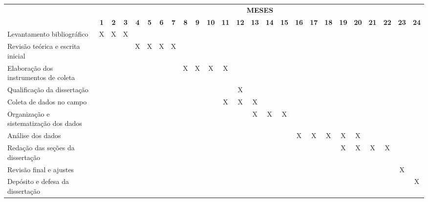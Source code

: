 \documentclass[
  brazilian,
  12pt,
  letterpaper,
  DIV=11,
  numbers=noendperiod]{scrartcl}
\begin{document}
\begin{table}[htbp]
\centering
\scriptsize %
\setlength{\tabcolsep}{2.5pt} %
\renewcommand{\arraystretch}{1.4} 

\begin{tabular}{|l|c|c|c|c|c|c|c|c|c|c|c|c|c|c|c|c|c|c|c|c|c|c|c|c|}
\hline
\rowcolor[gray]{0.9} 
\multicolumn{1}{|c|}{\cellcolor[gray]{0.9}\textbf{ETAPAS DA PESQUISA}} & \multicolumn{24}{c|}{\cellcolor[gray]{0.9}\textbf{MESES}} \\ \cline{2-25} 
\rowcolor[gray]{0.9} 
\multicolumn{1}{|c|}{\cellcolor[gray]{0.9}} & \textbf{1} & \textbf{2} & \textbf{3} & \textbf{4} & \textbf{5} & \textbf{6} & \textbf{7} & \textbf{8} & \textbf{9} & \textbf{10} & \textbf{11} & \textbf{12} & \textbf{13} & \textbf{14} & \textbf{15} & \textbf{16} & \textbf{17} & \textbf{18} & \textbf{19} & \textbf{20} & \textbf{21} & \textbf{22} & \textbf{23} & \textbf{24} \\ \hline

Levantamento bibliográfico & X & X & X &  &  &  &  &  &  &  &  &  &  &  &  &  &  &  &  &  &  &  &  &  \\ \hline

Revisão teórica e escrita inicial &  &  &  & X & X & X & X &  &  &  &  &  &  &  &  &  &  &  &  &  &  &  &  &  \\ \hline

Elaboração dos instrumentos de coleta &  &  &  &  &  &  &  & X & X & X & X &  &  &  &  &  &  &  &  &  &  &  &  &  \\ \hline

Qualificação da dissertação &  &  &  &  &  &  &  &  &  &  &  & X &  &  &  &  &  &  &  &  &  &  &  &  \\ \hline

Coleta de dados no campo &  &  &  &  &  &  &  &  &  &  & X & X & X &  &  &  &  &  &  &  &  &  &  &  \\ \hline

Organização e sistematização dos dados &  &  &  &  &  &  &  &  &  &  &  &  & X & X & X &  &  &  &  &  &  &  &  &  \\ \hline

Análise dos dados &  &  &  &  &  &  &  &  &  &  &  &  &  &  &  & X & X & X & X & X &  &  &  &  \\ \hline

Redação das seções da dissertação &  &  &  &  &  &  &  &  &  &  &  &  &  &  &  &  &  &  & X & X & X & X &  &  \\ \hline

Revisão final e ajustes &  &  &  &  &  &  &  &  &  &  &  &  &  &  &  &  &  &  &  &  &  &  & X &  \\ \hline

Depósito e defesa da dissertação &  &  &  &  &  &  &  &  &  &  &  &  &  &  &  &  &  &  &  &  &  &  &  & X \\ \hline

\end{tabular}
\end{table}
\end{document}
